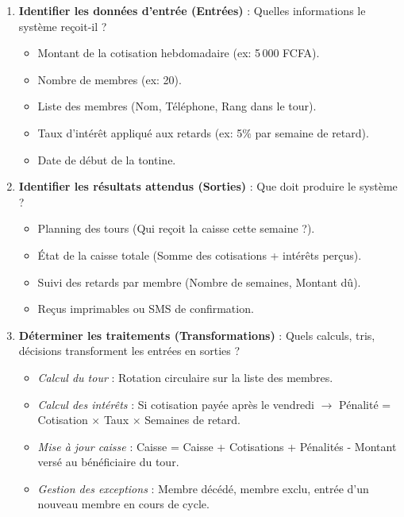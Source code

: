 \documentclass[11pt]{article}
\begin{document}
\begin{methode}
\begin{enumerate}
    \item \textbf{Identifier les données d'entrée (Entrées)} : Quelles informations le système reçoit-il ?
        \begin{itemize}
            \item Montant de la cotisation hebdomadaire (ex: 5\,000 FCFA).
            \item Nombre de membres (ex: 20).
            \item Liste des membres (Nom, Téléphone, Rang dans le tour).
            \item Taux d'intérêt appliqué aux retards (ex: 5\% par semaine de retard).
            \item Date de début de la tontine.
        \end{itemize}
    \item \textbf{Identifier les résultats attendus (Sorties)} : Que doit produire le système ?
        \begin{itemize}
            \item Planning des tours (Qui reçoit la caisse cette semaine ?).
            \item État de la caisse totale (Somme des cotisations + intérêts perçus).
            \item Suivi des retards par membre (Nombre de semaines, Montant dû).
            \item Reçus imprimables ou SMS de confirmation.
        \end{itemize}
    \item \textbf{Déterminer les traitements (Transformations)} : Quels calculs, tris, décisions transforment les entrées en sorties ?
        \begin{itemize}
            \item \textit{Calcul du tour} : Rotation circulaire sur la liste des membres.
            \item \textit{Calcul des intérêts} : Si cotisation payée après le vendredi $\rightarrow$ Pénalité = Cotisation $\times$ Taux $\times$ Semaines de retard.
            \item \textit{Mise à jour caisse} : Caisse = Caisse + Cotisations + Pénalités - Montant versé au bénéficiaire du tour.
            \item \textit{Gestion des exceptions} : Membre décédé, membre exclu, entrée d'un nouveau membre en cours de cycle.
        \end{itemize}
\end{enumerate}
\end{methode}
\end{document}
